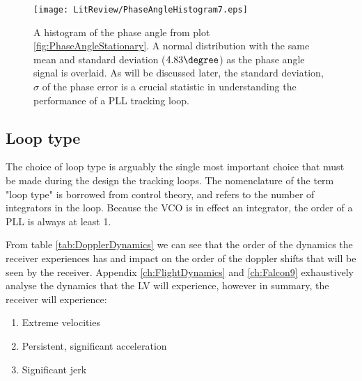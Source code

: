 \begin{figure}[!htb] 
    \centering
    \texttt{[image: LitReview/PhaseAngleHistogram7.eps]} 
    \caption{A histogram of the phase angle from plot \ref{fig:PhaseAngleStationary}. A normal distribution with the 
    same mean and standard deviation ($4.83\degree$) as the phase angle signal is overlaid. As will be discussed later, the standard deviation, $\sigma$ of the phase error is a crucial statistic in understanding the performance of a PLL tracking loop.}
    \label{fig:PhaseAngleHistogramStationary}
\end{figure}

	\subsection{Loop type}
    The choice of loop type is arguably the single most important choice that must be made
    during the design the tracking loops. The nomenclature of the term "loop type" is borrowed from control theory, 
    and refers to the number of integrators in the loop\cite{Gardner}. Because the \ac{VCO} is in effect an integrator,
    the order of a PLL is always at least 1. 
    
    From table \ref{tab:DopplerDynamics} we can see that the order of the dynamics the receiver
    experiences has and impact on the order of the doppler shifts that will be seen by the receiver. Appendix \ref{ch:FlightDynamics}
    and \ref{ch:Falcon9} exhaustively analyse the dynamics that the \ac{LV} will experience, however in summary, the receiver will experience:
    
    \begin{enumerate}
    \item{Extreme velocities}
    \item{Persistent, significant acceleration}
    \item{Significant jerk}
    \end{enumerate}
    
